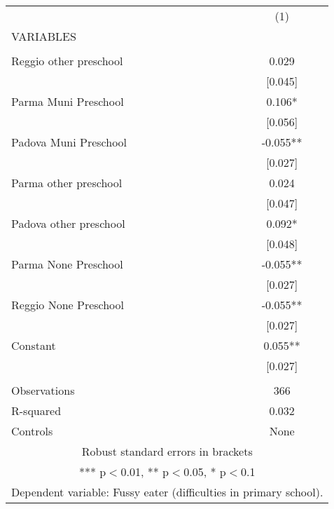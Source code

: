 \begin{tabular}{lc} \hline
 & (1) \\
VARIABLES &  \\ \hline
 &  \\
Reggio other preschool & 0.029 \\
 & [0.045] \\
Parma Muni Preschool & 0.106* \\
 & [0.056] \\
Padova Muni Preschool & -0.055** \\
 & [0.027] \\
Parma other preschool & 0.024 \\
 & [0.047] \\
Padova other preschool & 0.092* \\
 & [0.048] \\
Parma None Preschool & -0.055** \\
 & [0.027] \\
Reggio None Preschool & -0.055** \\
 & [0.027] \\
Constant & 0.055** \\
 & [0.027] \\
 &  \\
Observations & 366 \\
R-squared & 0.032 \\
 Controls & None \\ \hline
\multicolumn{2}{c}{ Robust standard errors in brackets} \\
\multicolumn{2}{c}{ *** p$<$0.01, ** p$<$0.05, * p$<$0.1} \\
\multicolumn{2}{c}{ Dependent variable: Fussy eater (difficulties in primary school).} \\
\end{tabular}
